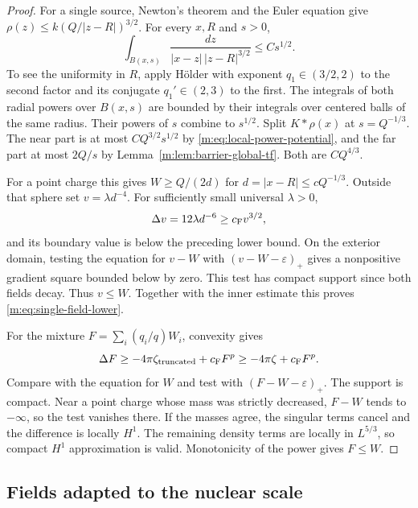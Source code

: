 \begin{proof}
For a single source, Newton's theorem and the Euler equation give
$\rho(z)\le k(Q/|z-R|)^{3/2}$.  For every $x,R$ and $s>0$,
\begin{equation}\label{m:eq:local-power-potential}
 \int_{B(x,s)}\frac{dz}{|x-z|\,|z-R|^{3/2}}
       \le Cs^{1/2}.
\end{equation}
To see the uniformity in $R$, apply H\"older with exponent $q_1\in(3/2,2)$
to the second factor and its conjugate $q_1'\in(2,3)$ to the first.
The integrals of both radial powers over $B(x,s)$ are bounded by their
integrals over centered balls of the same radius.  Their powers of $s$
combine to $s^{1/2}$.  Split $K*\rho(x)$ at $s=Q^{-1/3}$.  The near
part is at most $CQ^{3/2}s^{1/2}$ by
\eqref{m:eq:local-power-potential}, and the far part at most $2Q/s$ by
Lemma~\ref{m:lem:barrier-global-tf}.  Both are $CQ^{4/3}$.

For a point charge this gives $W\ge Q/(2d)$ for
$d=|x-R|\le cQ^{-1/3}$.  Outside that sphere set $v=\lambda d^{-4}$.
For sufficiently small universal $\lambda>0$,
\[
 \Delta v=12\lambda d^{-6}\ge c_{\mathrm F} v^{3/2},
\]
and its boundary value is below the preceding lower bound.  On the
exterior domain, testing the equation for $v-W$ with
$(v-W-\varepsilon)_+$ gives a nonpositive gradient square bounded
below by zero.  This test has compact support since both fields decay.
Thus $v\le W$.  Together with the inner estimate this proves
\eqref{m:eq:single-field-lower}.

For the mixture $F=\sum_i(q_i/q)W_i$, convexity gives
\[
 \Delta F\ge-4\pi\zeta_{\rm truncated}+c_{\mathrm F} F^p
            \ge-4\pi\zeta+c_{\mathrm F} F^p.
\]
Compare with the equation for $W$ and test with
$(F-W-\varepsilon)_+$.  The support is compact.  Near a point charge
whose mass was strictly decreased, $F-W$ tends to $-\infty$, so the
test vanishes there.  If the masses agree, the singular terms cancel
and the difference is locally $H^1$.  The remaining density terms are
locally in $L^{5/3}$, so compact $H^1$ approximation is valid.  Monotonicity
of the power gives $F\le W$.
\end{proof}

\subsection{Fields adapted to the nuclear scale}

